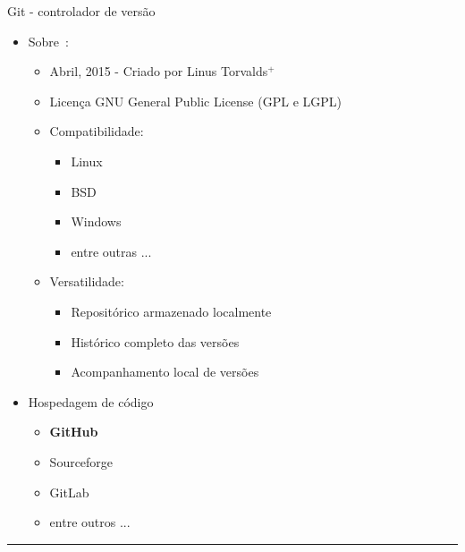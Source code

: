 \documentclass{beamer}
\begin{document}
\begin{frame}{Git - controlador de versão}
  \begin{itemize}
  \item Sobre~\cite{Wiki2017b}:
    \begin{itemize}
    \item Abril, 2015 - Criado por Linus Torvalds$^+$
    \item Licença GNU General Public License (GPL e LGPL)
    \item Compatibilidade:
      \begin{itemize}
      \item Linux
      \item BSD
      \item Windows
      \item entre outras ...        
      \end{itemize}
    \item Versatilidade:
      \begin{itemize}
      \item Repositórico armazenado localmente
      \item Histórico completo das versões
      \item Acompanhamento local de versões
      \end{itemize}
    \end{itemize}
  \end{itemize}
  \begin{itemize}
  \item Hospedagem de código
    \begin{itemize}
    \item {\bf GitHub}
    \item Sourceforge
    \item GitLab
    \item entre outros ...
    \end{itemize}
  \end{itemize}
  \vspace{0.25cm}
  \begin{minipage}[hb!]{1.0\linewidth}
    \hrule
    \begin{bibdiv}
      \begin{biblist*}
      \end{biblist*}
    \end{bibdiv}
  \end{minipage}
\end{frame}
\end{document}

